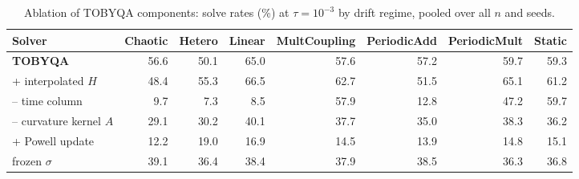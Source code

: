 \begin{table}[t]
\centering\small
\caption{Ablation of TOBYQA components: solve rates (\%) at $\tau=10^{-3}$ by drift regime, pooled over all $n$ and seeds.}
\label{tab:ablation}
\begin{tabular}{lrrrrrrr}
\toprule
Solver & Chaotic & Hetero & Linear & MultCoupling & PeriodicAdd & PeriodicMult & Static \\
\midrule
\textbf{TOBYQA} & 56.6 & 50.1 & 65.0 & 57.6 & 57.2 & 59.7 & 59.3 \\
\quad + interpolated $H$ & 48.4 & 55.3 & 66.5 & 62.7 & 51.5 & 65.1 & 61.2 \\
\quad -- time column & 9.7 & 7.3 & 8.5 & 57.9 & 12.8 & 47.2 & 59.7 \\
\quad -- curvature kernel $A$ & 29.1 & 30.2 & 40.1 & 37.7 & 35.0 & 38.3 & 36.2 \\
\quad + Powell update & 12.2 & 19.0 & 16.9 & 14.5 & 13.9 & 14.8 & 15.1 \\
\quad frozen $\sigma$ & 39.1 & 36.4 & 38.4 & 37.9 & 38.5 & 36.3 & 36.8 \\
\bottomrule
\end{tabular}
\end{table}